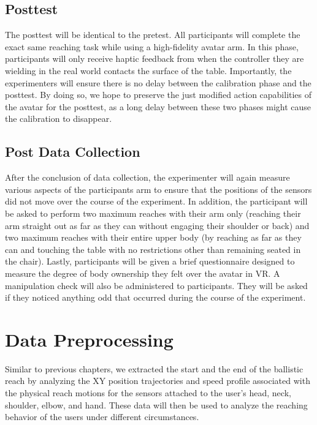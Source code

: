 \subsection{Posttest}
The posttest will be identical to the pretest. All participants will complete the exact same reaching task while using a high-fidelity avatar arm. In this phase, participants will only receive haptic feedback from when the controller they are wielding in the real world contacts the surface of the table. Importantly, the experimenters will ensure there is no delay between the calibration phase and the posttest. By doing so, we hope to preserve the just modified action capabilities of the avatar for the posttest, as a long delay between these two phases might cause the calibration to disappear.

\subsection{Post Data Collection}
After the conclusion of data collection, the experimenter will again measure various aspects of the participants arm to ensure that the positions of the sensors did not move over the course of the experiment. In addition, the participant will be asked to perform two maximum reaches with their arm only (reaching their arm straight out as far as they can without engaging their shoulder or back) and two maximum reaches with their entire upper body (by reaching as far as they can and touching the table with no restrictions other than remaining seated in the chair). Lastly, participants will be given a brief questionnaire designed to measure the degree of body ownership they felt over the avatar in VR. A manipulation check will also be administered to participants. They will be asked if they noticed anything odd that occurred during the course of the experiment.


\section{Data Preprocessing}
Similar to previous chapters, we extracted the start and the end of the ballistic reach by analyzing the XY position trajectories and speed profile associated with the physical reach motions for the sensors attached to the user's head, neck, shoulder, elbow, and hand. These data will then be used to analyze the reaching behavior of the users under different circumstances. 


